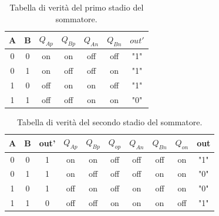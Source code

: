 \documentclass[a4paper,10pt]{article}
\begin{document}
\begin{table}[h!]
\begin{center}
\begin{tabular}{ |c|c|c|c|c|c|c| } 
 \hline
   A & B & $Q_{Ap}$ & $Q_{Bp}$ & $Q_{An}$ & $Q_{Bn}$ & $out'$  \\ 
  \hline
   0 & 0 & on & on & off & off & "1" \\ 
   0 & 1 & on & off & off & on & "1" \\ 
   1 & 0 & off & on & on & off & "1" \\ 
   1 & 1 & off & off & on & on & "0" \\ 
 \hline
\end{tabular}
 \caption{Tabella di verità del primo stadio del sommatore.}
\label{tabellastad1}
\end{center}
\end{table}
\begin{table}[h!]
\begin{center}
\begin{tabular}{ |c|c|c|c|c|c|c|c|c|c| } 
 \hline
   A & B & out' & $Q_{Ap}$ & $Q_{Bp}$ & $Q_{op}$ & $Q_{An}$ & $Q_{Bn}$ & $Q_{on}$ & out \\ 
  \hline
   0 & 0 & 1 & on & on & off & off & off & on & "1" \\ 
   0 & 1 & 1 & on & off & off & off & on & on & "0" \\ 
   1 & 0 & 1 & off & on & off & on & off & on & "0" \\ 
   1 & 1 & 0 & off & off & on & on & on & off & "1" \\ 
 \hline
\end{tabular}
 \caption{Tabella di verità del secondo stadio del sommatore.}
\label{tabellastad2}
\end{center}
\end{table}
\end{document}
